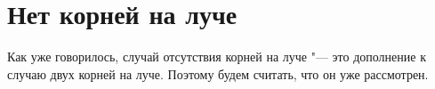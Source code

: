 \section {Нет корней на луче}

Как уже говорилось, случай отсутствия корней на луче "--- это дополнение к случаю двух корней на 
луче. Поэтому будем считать, что он уже рассмотрен.